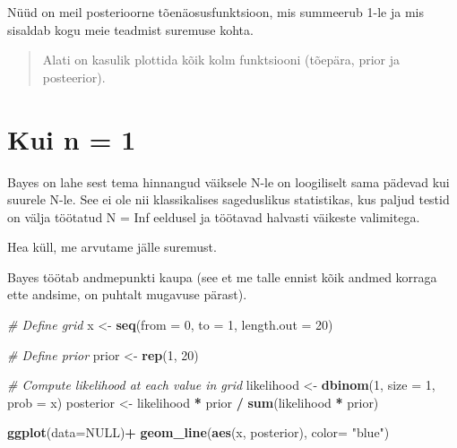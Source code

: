 \documentclass[]{book}
\newenvironment{Shaded}{\begin{snugshade}}{\end{snugshade}}
\newcommand{\CommentTok}[1]{\textcolor[rgb]{0.56,0.35,0.01}{\textit{#1}}}
\newcommand{\DataTypeTok}[1]{\textcolor[rgb]{0.13,0.29,0.53}{#1}}
\newcommand{\DecValTok}[1]{\textcolor[rgb]{0.00,0.00,0.81}{#1}}
\newcommand{\KeywordTok}[1]{\textcolor[rgb]{0.13,0.29,0.53}{\textbf{#1}}}
\newcommand{\NormalTok}[1]{#1}
\newcommand{\OperatorTok}[1]{\textcolor[rgb]{0.81,0.36,0.00}{\textbf{#1}}}
\newcommand{\OtherTok}[1]{\textcolor[rgb]{0.56,0.35,0.01}{#1}}
\newcommand{\StringTok}[1]{\textcolor[rgb]{0.31,0.60,0.02}{#1}}
\begin{document}
Nüüd on meil posterioorne tõenäosusfunktsioon, mis summeerub 1-le ja mis sisaldab kogu meie teadmist suremuse kohta.

\begin{quote}
Alati on kasulik plottida kõik kolm funktsiooni (tõepära, prior ja posteerior).
\end{quote}

\hypertarget{kui-n-1}{%
\section*{Kui n = 1}\label{kui-n-1}}

Bayes on lahe sest tema hinnangud väiksele N-le on loogiliselt sama pädevad kui suurele N-le. See ei ole nii klassikalises sageduslikus statistikas, kus paljud testid on välja töötatud N = Inf eeldusel ja töötavad halvasti väikeste valimitega.

Hea küll, me arvutame jälle suremust.

Bayes töötab andmepunkti kaupa (see et me talle ennist kõik andmed korraga ette andsime, on puhtalt mugavuse pärast).



\begin{Shaded}
\begin{Highlighting}[]
\CommentTok{# Define grid}
\NormalTok{x <-}\StringTok{ }\KeywordTok{seq}\NormalTok{(}\DataTypeTok{from =} \DecValTok{0}\NormalTok{, }\DataTypeTok{to =} \DecValTok{1}\NormalTok{, }\DataTypeTok{length.out =} \DecValTok{20}\NormalTok{)}

\CommentTok{# Define prior}
\NormalTok{prior <-}\StringTok{ }\KeywordTok{rep}\NormalTok{(}\DecValTok{1}\NormalTok{, }\DecValTok{20}\NormalTok{)}

\CommentTok{# Compute likelihood at each value in grid}
\NormalTok{likelihood <-}\StringTok{ }\KeywordTok{dbinom}\NormalTok{(}\DecValTok{1}\NormalTok{, }\DataTypeTok{size =} \DecValTok{1}\NormalTok{, }\DataTypeTok{prob =}\NormalTok{ x)}
\NormalTok{posterior <-}\StringTok{ }\NormalTok{likelihood }\OperatorTok{*}\StringTok{ }\NormalTok{prior }\OperatorTok{/}\StringTok{ }\KeywordTok{sum}\NormalTok{(likelihood }\OperatorTok{*}\StringTok{ }\NormalTok{prior)}

\KeywordTok{ggplot}\NormalTok{(}\DataTypeTok{data=}\OtherTok{NULL}\NormalTok{)}\OperatorTok{+}
\StringTok{  }\KeywordTok{geom_line}\NormalTok{(}\KeywordTok{aes}\NormalTok{(x, posterior), }\DataTypeTok{color=} \StringTok{"blue"}\NormalTok{)}
\end{Highlighting}
\end{Shaded}
\end{document}
